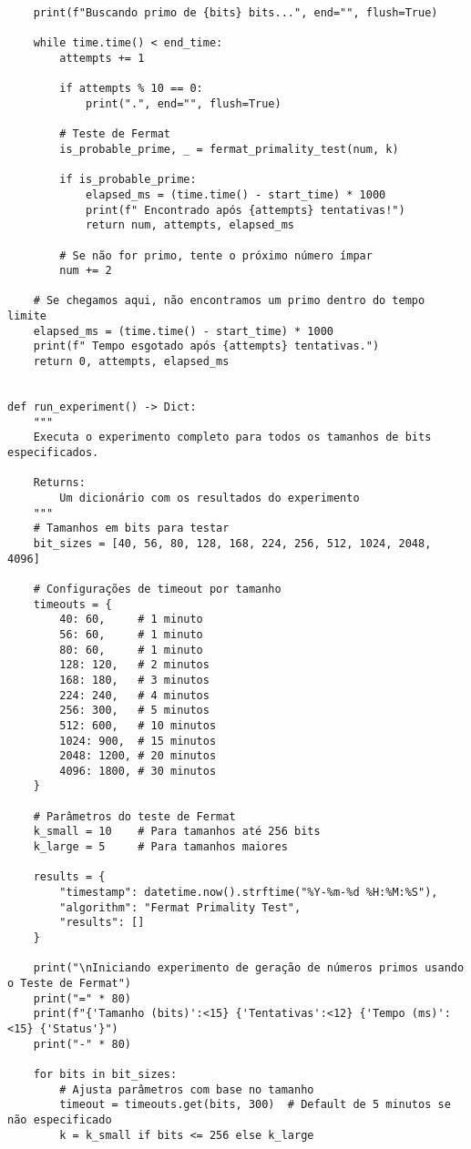\begin{verbatim}
    print(f"Buscando primo de {bits} bits...", end="", flush=True)
    
    while time.time() < end_time:
        attempts += 1
        
        if attempts % 10 == 0:
            print(".", end="", flush=True)
        
        # Teste de Fermat
        is_probable_prime, _ = fermat_primality_test(num, k)
        
        if is_probable_prime:
            elapsed_ms = (time.time() - start_time) * 1000
            print(f" Encontrado após {attempts} tentativas!")
            return num, attempts, elapsed_ms
        
        # Se não for primo, tente o próximo número ímpar
        num += 2
    
    # Se chegamos aqui, não encontramos um primo dentro do tempo limite
    elapsed_ms = (time.time() - start_time) * 1000
    print(f" Tempo esgotado após {attempts} tentativas.")
    return 0, attempts, elapsed_ms


def run_experiment() -> Dict:
    """
    Executa o experimento completo para todos os tamanhos de bits especificados.
    
    Returns:
        Um dicionário com os resultados do experimento
    """
    # Tamanhos em bits para testar
    bit_sizes = [40, 56, 80, 128, 168, 224, 256, 512, 1024, 2048, 4096]
    
    # Configurações de timeout por tamanho
    timeouts = {
        40: 60,     # 1 minuto
        56: 60,     # 1 minuto
        80: 60,     # 1 minuto
        128: 120,   # 2 minutos
        168: 180,   # 3 minutos
        224: 240,   # 4 minutos
        256: 300,   # 5 minutos
        512: 600,   # 10 minutos
        1024: 900,  # 15 minutos
        2048: 1200, # 20 minutos
        4096: 1800, # 30 minutos
    }
    
    # Parâmetros do teste de Fermat
    k_small = 10    # Para tamanhos até 256 bits
    k_large = 5     # Para tamanhos maiores
    
    results = {
        "timestamp": datetime.now().strftime("%Y-%m-%d %H:%M:%S"),
        "algorithm": "Fermat Primality Test",
        "results": []
    }
    
    print("\nIniciando experimento de geração de números primos usando o Teste de Fermat")
    print("=" * 80)
    print(f"{'Tamanho (bits)':<15} {'Tentativas':<12} {'Tempo (ms)':<15} {'Status'}")
    print("-" * 80)
    
    for bits in bit_sizes:
        # Ajusta parâmetros com base no tamanho
        timeout = timeouts.get(bits, 300)  # Default de 5 minutos se não especificado
        k = k_small if bits <= 256 else k_large
        

\end{verbatim}
